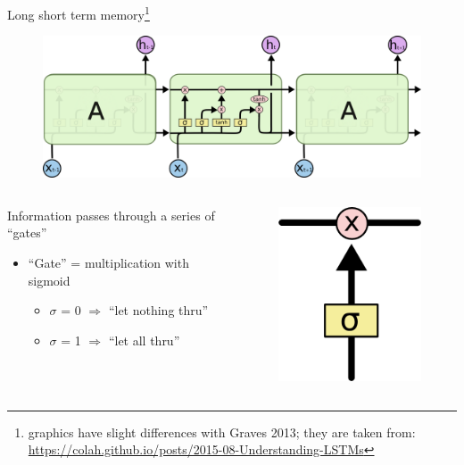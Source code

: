 \documentclass[10pt,xcolor=dvipsnames]{beamer}
\begin{document}
\begin{frame}{Long short term memory\footnote{graphics have slight differences
      with Graves 2013; they are taken from: \\
      \url{https://colah.github.io/posts/2015-08-Understanding-LSTMs}} }
 \begin{figure}
   \centering
   \includegraphics[width=\linewidth]{fig/LSTM3-chain.png} 
 \end{figure}
\begin{columns}
  \begin{column}{.7\textwidth}
   Information passes through a series of ``gates''
   \begin{itemize}
   \item ``Gate'' = multiplication with sigmoid
     \begin{itemize}
     \item $\sigma$ = 0 $\Rightarrow$ ``let nothing thru''
     \item $\sigma$ = 1 $\Rightarrow$ ``let all thru''
     \end{itemize}
   \end{itemize}
  \end{column}

  \begin{column}{.3\textwidth}
      \begin{figure}
        \includegraphics[width=.4\linewidth]{fig/LSTM3-gate.png} 
        \label{fig:gate}
      \end{figure}
  \end{column}
\end{columns}
\end{frame}
\end{document}
